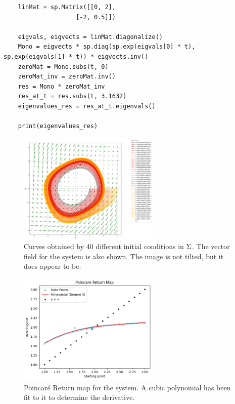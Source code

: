 \begin{solution}
\begin{lstlisting}
    linMat = sp.Matrix([[0, 2], 
                    [-2, 0.5]])

    eigvals, eigvects = linMat.diagonalize()
    Mono = eigvects * sp.diag(sp.exp(eigvals[0] * t), sp.exp(eigvals[1] * t)) * eigvects.inv()
    zeroMat = Mono.subs(t, 0)
    zeroMat_inv = zeroMat.inv()
    res = Mono * zeroMat_inv
    res_at_t = res.subs(t, 3.1632)
    eigenvalues_res = res_at_t.eigenvals()
    
    print(eigenvalues_res)  
    \end{lstlisting}
    
    
    \newpage
    \begin{figure}[ht]
        \centering
        \includegraphics[width = 0.6\textwidth]{Images/problem 2 curves.png}
        \caption{Curves obtained by 40 different initial conditions in $\Sigma$. The vector field for the system is also shown. The image is not tilted, but it does appear to be.}
        \label{fig:p2 curves}
    \end{figure}
    \begin{figure}[!ht]
        \centering
        \includegraphics[width = 0.6\textwidth]{Images/Problem 2 return map.png}
        \caption{Poincar\'e Return map for the system. A cubic polynomial has been fit to it to determine the derivative.}
        \label{fig:p2 return map}
    \end{figure}


\end{solution}

